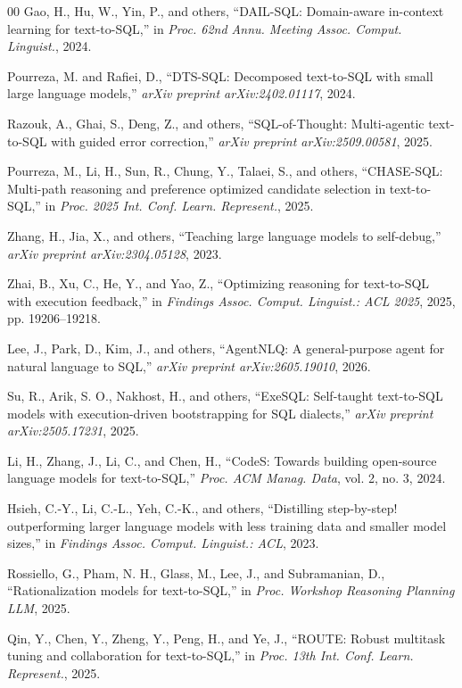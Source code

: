 \documentclass[conference]{IEEEtran}
\begin{document}
\begin{thebibliography}{00}
 Gao, H., Hu, W., Yin, P., and others, ``DAIL-SQL: Domain-aware in-context learning for text-to-SQL,'' in \textit{Proc. 62nd Annu. Meeting Assoc. Comput. Linguist.}, 2024.

 Pourreza, M. and Rafiei, D., ``DTS-SQL: Decomposed text-to-SQL with small large language models,'' \textit{arXiv preprint arXiv:2402.01117}, 2024.

 Razouk, A., Ghai, S., Deng, Z., and others, ``SQL-of-Thought: Multi-agentic text-to-SQL with guided error correction,'' \textit{arXiv preprint arXiv:2509.00581}, 2025.

 Pourreza, M., Li, H., Sun, R., Chung, Y., Talaei, S., and others, ``CHASE-SQL: Multi-path reasoning and preference optimized candidate selection in text-to-SQL,'' in \textit{Proc. 2025 Int. Conf. Learn. Represent.}, 2025.

 Zhang, H., Jia, X., and others, ``Teaching large language models to self-debug,'' \textit{arXiv preprint arXiv:2304.05128}, 2023.

 Zhai, B., Xu, C., He, Y., and Yao, Z., ``Optimizing reasoning for text-to-SQL with execution feedback,'' in \textit{Findings Assoc. Comput. Linguist.: ACL 2025}, 2025, pp. 19206--19218.

 Lee, J., Park, D., Kim, J., and others, ``AgentNLQ: A general-purpose agent for natural language to SQL,'' \textit{arXiv preprint arXiv:2605.19010}, 2026.

 Su, R., Arik, S. O., Nakhost, H., and others, ``ExeSQL: Self-taught text-to-SQL models with execution-driven bootstrapping for SQL dialects,'' \textit{arXiv preprint arXiv:2505.17231}, 2025.

 Li, H., Zhang, J., Li, C., and Chen, H., ``CodeS: Towards building open-source language models for text-to-SQL,'' \textit{Proc. ACM Manag. Data}, vol. 2, no. 3, 2024.

 Hsieh, C.-Y., Li, C.-L., Yeh, C.-K., and others, ``Distilling step-by-step! outperforming larger language models with less training data and smaller model sizes,'' in \textit{Findings Assoc. Comput. Linguist.: ACL}, 2023.

 Rossiello, G., Pham, N. H., Glass, M., Lee, J., and Subramanian, D., ``Rationalization models for text-to-SQL,'' in \textit{Proc. Workshop Reasoning Planning LLM}, 2025.

 Qin, Y., Chen, Y., Zheng, Y., Peng, H., and Ye, J., ``ROUTE: Robust multitask tuning and collaboration for text-to-SQL,'' in \textit{Proc. 13th Int. Conf. Learn. Represent.}, 2025.


\end{thebibliography}
\end{document}
